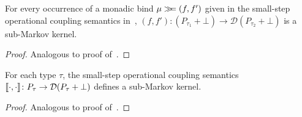 \begin{lemma}\label{lem:bind-kernel-coupling}
	For every occurrence of a monadic bind $\mu \gg\!\!= (f,f')$ given in the small-step operational coupling semantics in~, $(f,f') \colon (P_{\tau_1} + \bot) \to \mathcal{D}(P_{\tau_2} + \bot)$ is a sub-Markov kernel.
\end{lemma}

\begin{proof}
	Analogous to proof of~.
\end{proof}

\begin{lemma}\label{lem:small-step-coupling-kernel}
	For each type $\tau$, the small-step operational coupling semantics $\llbracket \cdot, \cdot \rrbracket \colon P_{\tau} \to \mathcal{D}(P_\tau + \bot)$ defines a sub-Markov kernel.
\end{lemma}

\begin{proof}
	Analogous to proof of~.
\end{proof}


